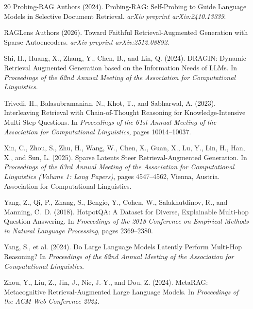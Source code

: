 \documentclass{article}
\begin{document}
\begin{thebibliography}{20}
{Probing-RAG Authors} (2024).
Probing-RAG: Self-Probing to Guide Language Models in Selective Document Retrieval.
\textit{arXiv preprint arXiv:2410.13339}.

{RAGLens Authors} (2026).
Toward Faithful Retrieval-Augmented Generation with Sparse Autoencoders.
\textit{arXiv preprint arXiv:2512.08892}.

Shi, H., Huang, X., Zhang, Y., Chen, B., and Lin, Q. (2024).
DRAGIN: Dynamic Retrieval Augmented Generation based on the Information Needs of LLMs.
In \textit{Proceedings of the 62nd Annual Meeting of the Association for Computational Linguistics}.

Trivedi, H., Balasubramanian, N., Khot, T., and Sabharwal, A. (2023).
Interleaving Retrieval with Chain-of-Thought Reasoning for Knowledge-Intensive Multi-Step Questions.
In \textit{Proceedings of the 61st Annual Meeting of the Association for Computational Linguistics}, pages 10014--10037.

Xin, C., Zhou, S., Zhu, H., Wang, W., Chen, X., Guan, X., Lu, Y., Lin, H., Han, X., and Sun, L. (2025).
Sparse Latents Steer Retrieval-Augmented Generation.
In \textit{Proceedings of the 63rd Annual Meeting of the Association for Computational Linguistics (Volume 1: Long Papers)}, pages 4547--4562, Vienna, Austria. Association for Computational Linguistics.

Yang, Z., Qi, P., Zhang, S., Bengio, Y., Cohen, W., Salakhutdinov, R., and Manning, C.~D. (2018).
HotpotQA: A Dataset for Diverse, Explainable Multi-hop Question Answering.
In \textit{Proceedings of the 2018 Conference on Empirical Methods in Natural Language Processing}, pages 2369--2380.

Yang, S., et al. (2024).
Do Large Language Models Latently Perform Multi-Hop Reasoning?
In \textit{Proceedings of the 62nd Annual Meeting of the Association for Computational Linguistics}.

Zhou, Y., Liu, Z., Jin, J., Nie, J.-Y., and Dou, Z. (2024).
MetaRAG: Metacognitive Retrieval-Augmented Large Language Models.
In \textit{Proceedings of the ACM Web Conference 2024}.

\end{thebibliography}
\end{document}
